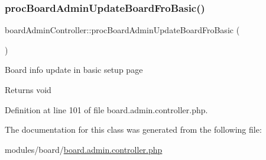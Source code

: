 \hypertarget{classboardAdminController_a5bb01a312930634bf43e59dd9fef87e5}{}\label{classboardAdminController_a5bb01a312930634bf43e59dd9fef87e5} 
\subsubsection{\texorpdfstring{proc\+Board\+Admin\+Update\+Board\+Fro\+Basic()}{procBoardAdminUpdateBoardFroBasic()}}
{\footnotesize\ttfamily board\+Admin\+Controller\+::proc\+Board\+Admin\+Update\+Board\+Fro\+Basic (\begin{DoxyParamCaption}{ }\end{DoxyParamCaption})}

Board info update in basic setup page \begin{DoxyReturn}{Returns}
void 
\end{DoxyReturn}


Definition at line 101 of file board.\+admin.\+controller.\+php.



The documentation for this class was generated from the following file\+:\begin{DoxyCompactItemize}
\item 
modules/board/\hyperlink{board_8admin_8controller_8php}{board.\+admin.\+controller.\+php}\end{DoxyCompactItemize}
